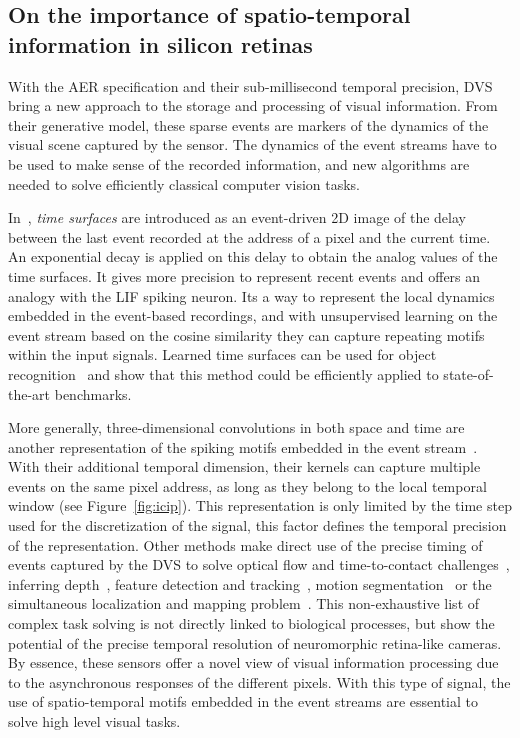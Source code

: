 \documentclass[brainsci, %
               review,submit,pdftex,moreauthors
               ]{Definitions/mdpi}
\begin{document}
\subsection{On the importance of spatio-temporal information in silicon retinas}
%
With the AER specification and their sub-millisecond temporal precision, DVS bring a new approach to the storage and processing of visual information. From their generative model, these sparse events are markers of the dynamics of the visual scene captured by the sensor. The dynamics of the event streams have to be used to make sense of the recorded information, and new algorithms are needed to solve efficiently classical computer vision tasks. 

In~\citep{lagorce_hots_2017}, \emph{time surfaces} are introduced as an event-driven 2D image of the delay between the last event recorded at the address of a pixel and the current time. An exponential decay is applied on this delay to obtain the analog values of the time surfaces. It gives more precision to represent recent events and offers an analogy with the LIF spiking neuron. Its a way to represent the local dynamics embedded in the event-based recordings, and with unsupervised learning on the event stream based on the cosine similarity they can capture repeating motifs within the input signals. Learned time surfaces can be used for object recognition~\citep{lagorce_hots_2017, sironi_hats_2018, maro_event-based_2020, grimaldi_homeostatic_2021,grimaldi_robust_2022} and show that this method could be efficiently applied to state-of-the-art benchmarks.

More generally, three-dimensional convolutions in both space and time are another representation of the spiking motifs embedded in the event stream~\citep{ghosh_spatiotemporal_2019, grimaldi_learning_2022, yu_stsc-snn_2022}. With their additional temporal dimension, their kernels can capture multiple events on the same pixel address, as long as they belong to the local temporal window (see Figure~\ref{fig:icip}). This representation is only limited by the time step used for the discretization of the signal, this factor defines the temporal precision of the representation. Other methods make direct use of the precise timing of events captured by the DVS to solve optical flow and time-to-contact challenges~\citep{benosman_event-based_2014, clady_asynchronous_2014, tschechne_bio-inspired_2014}, inferring depth~\citep{hidalgo-carrio_learning_2020}, feature detection and tracking~\citep{dardelet_event-by-event_2021}, motion segmentation~\citep{stoffregen_event-based_2019} or the simultaneous localization and mapping problem~\citep{kim_real-time_2016}. This non-exhaustive list of complex task solving is not directly linked to biological processes, but show the potential of the precise temporal resolution of neuromorphic retina-like cameras. By essence, these sensors offer a novel view of visual information processing due to the asynchronous responses of the different pixels. With this type of signal, the use of spatio-temporal motifs embedded in the event streams are essential to solve high level visual tasks. 
%
\end{document}
